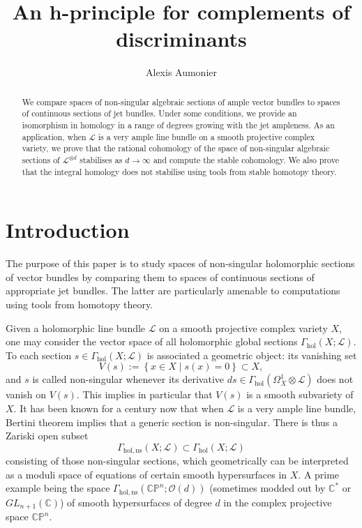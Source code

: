 \documentclass[a4paper]{amsart}
\title[An h-principle for complements of discriminants]{An h-principle for complements of discriminants}
\author[Alexis Aumonier]{Alexis Aumonier}
\newcommand{\bC}{\mathbb C}
\newcommand{\bP}{\mathbb P}
\newcommand{\cL}{\mathcal L}
\newcommand{\cO}{\mathcal O}
\theoremstyle{plain}
\theoremstyle{definition}
\newcommand{\Gammahol}{\Gamma_{\mathrm{hol}}}
\begin{document}
\maketitle

\begin{abstract}
We compare spaces of non-singular algebraic sections of ample vector bundles to spaces of continuous sections of jet bundles. Under some conditions, we provide an isomorphism in homology in a range of degrees growing with the jet ampleness. As an application, when $\cL$ is a very ample line bundle on a smooth projective complex variety, we prove that the rational cohomology of the space of non-singular algebraic sections of $\cL^{\otimes d}$ stabilises as $d \to \infty$ and compute the stable cohomology. We also prove that the integral homology does not stabilise using tools from stable homotopy theory.
\end{abstract}



\section{Introduction}

The purpose of this paper is to study spaces of non-singular holomorphic sections of vector bundles by comparing them to spaces of continuous sections of appropriate jet bundles. The latter are particularly amenable to computations using tools from homotopy theory.

Given a holomorphic line bundle $\cL$ on a smooth projective complex variety $X$, one may consider the vector space of all holomorphic global sections $\Gammahol(X; \cL)$. To each section $s \in \Gammahol(X;\cL)$ is associated a geometric object: its vanishing set
\[
    V(s) := \left\{ x \in X \mid s(x) = 0 \right\} \subset X,
\]
and $s$ is called non-singular whenever its derivative $ds \in \Gammahol(\Omega^1_X \otimes \cL)$ does not vanish on $V(s)$. This implies in particular that $V(s)$ is a smooth subvariety of $X$. It has been known for a century now that when $\cL$ is a very ample line bundle, Bertini theorem implies that a generic section is non-singular. There is thus a Zariski open subset
\[
    \Gamma_{\mathrm{hol,ns}}(X;\cL) \subset \Gammahol(X;\cL)
\]
consisting of those non-singular sections, which geometrically can be interpreted as a moduli space of equations of certain smooth hypersurfaces in $X$. A prime example being the space $\Gamma_{\mathrm{hol,ns}}(\bC\bP^n;\cO(d))$ (sometimes modded out by $\bC^*$ or $GL_{n+1}(\bC)$) of smooth hypersurfaces of degree $d$ in the complex projective space $\bC\bP^n$.
\end{document}

